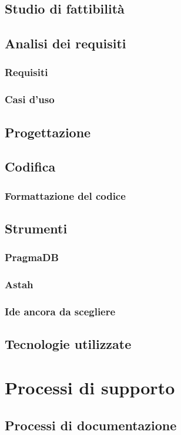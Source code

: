 	\subsection{Studio di fattibilità}
	\subsection{Analisi dei requisiti}
		\subsubsection{Requisiti}
		\subsubsection{Casi d'uso}
	\subsection{Progettazione}
	\subsection{Codifica}
		\subsubsection{Formattazione del codice}
	\subsection{Strumenti}
		\subsubsection{PragmaDB}
		\subsubsection{Astah}
		\subsubsection{Ide ancora da scegliere}
	\subsection{Tecnologie utilizzate}
\section{Processi di supporto}
	\subsection{Processi di documentazione}
